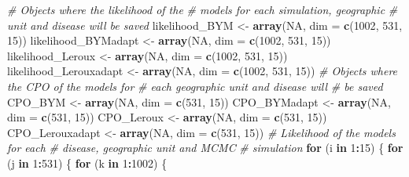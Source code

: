 \documentclass[]{article}
\newenvironment{Shaded}{\begin{snugshade}}{\end{snugshade}}
\newcommand{\KeywordTok}[1]{\textcolor[rgb]{0.13,0.29,0.53}{\textbf{#1}}}
\newcommand{\DataTypeTok}[1]{\textcolor[rgb]{0.13,0.29,0.53}{#1}}
\newcommand{\DecValTok}[1]{\textcolor[rgb]{0.00,0.00,0.81}{#1}}
\newcommand{\StringTok}[1]{\textcolor[rgb]{0.31,0.60,0.02}{#1}}
\newcommand{\CommentTok}[1]{\textcolor[rgb]{0.56,0.35,0.01}{\textit{#1}}}
\newcommand{\OtherTok}[1]{\textcolor[rgb]{0.56,0.35,0.01}{#1}}
\newcommand{\ControlFlowTok}[1]{\textcolor[rgb]{0.13,0.29,0.53}{\textbf{#1}}}
\newcommand{\OperatorTok}[1]{\textcolor[rgb]{0.81,0.36,0.00}{\textbf{#1}}}
\newcommand{\NormalTok}[1]{#1}
\begin{document}
\begin{Shaded}
\begin{Highlighting}[]
\CommentTok{# Objects where the likelihood of the}
\CommentTok{# models for each simulation, geographic}
\CommentTok{# unit and disease will be saved}
\NormalTok{likelihood_BYM <-}\StringTok{ }\KeywordTok{array}\NormalTok{(}\OtherTok{NA}\NormalTok{, }\DataTypeTok{dim =} \KeywordTok{c}\NormalTok{(}\DecValTok{1002}\NormalTok{, }
    \DecValTok{531}\NormalTok{, }\DecValTok{15}\NormalTok{))}
\NormalTok{likelihood_BYMadapt <-}\StringTok{ }\KeywordTok{array}\NormalTok{(}\OtherTok{NA}\NormalTok{, }\DataTypeTok{dim =} \KeywordTok{c}\NormalTok{(}\DecValTok{1002}\NormalTok{, }
    \DecValTok{531}\NormalTok{, }\DecValTok{15}\NormalTok{))}
\NormalTok{likelihood_Leroux <-}\StringTok{ }\KeywordTok{array}\NormalTok{(}\OtherTok{NA}\NormalTok{, }\DataTypeTok{dim =} \KeywordTok{c}\NormalTok{(}\DecValTok{1002}\NormalTok{, }
    \DecValTok{531}\NormalTok{, }\DecValTok{15}\NormalTok{))}
\NormalTok{likelihood_Lerouxadapt <-}\StringTok{ }\KeywordTok{array}\NormalTok{(}\OtherTok{NA}\NormalTok{, }\DataTypeTok{dim =} \KeywordTok{c}\NormalTok{(}\DecValTok{1002}\NormalTok{, }
    \DecValTok{531}\NormalTok{, }\DecValTok{15}\NormalTok{))}
\CommentTok{# Objects where the CPO of the models for}
\CommentTok{# each geographic unit and disease will}
\CommentTok{# be saved}
\NormalTok{CPO_BYM <-}\StringTok{ }\KeywordTok{array}\NormalTok{(}\OtherTok{NA}\NormalTok{, }\DataTypeTok{dim =} \KeywordTok{c}\NormalTok{(}\DecValTok{531}\NormalTok{, }\DecValTok{15}\NormalTok{))}
\NormalTok{CPO_BYMadapt <-}\StringTok{ }\KeywordTok{array}\NormalTok{(}\OtherTok{NA}\NormalTok{, }\DataTypeTok{dim =} \KeywordTok{c}\NormalTok{(}\DecValTok{531}\NormalTok{, }\DecValTok{15}\NormalTok{))}
\NormalTok{CPO_Leroux <-}\StringTok{ }\KeywordTok{array}\NormalTok{(}\OtherTok{NA}\NormalTok{, }\DataTypeTok{dim =} \KeywordTok{c}\NormalTok{(}\DecValTok{531}\NormalTok{, }\DecValTok{15}\NormalTok{))}
\NormalTok{CPO_Lerouxadapt <-}\StringTok{ }\KeywordTok{array}\NormalTok{(}\OtherTok{NA}\NormalTok{, }\DataTypeTok{dim =} \KeywordTok{c}\NormalTok{(}\DecValTok{531}\NormalTok{, }
    \DecValTok{15}\NormalTok{))}
\CommentTok{# Likelihood of the models for each}
\CommentTok{# disease, geographic unit and MCMC}
\CommentTok{# simulation}
\ControlFlowTok{for}\NormalTok{ (i }\ControlFlowTok{in} \DecValTok{1}\OperatorTok{:}\DecValTok{15}\NormalTok{) \{}
    \ControlFlowTok{for}\NormalTok{ (j }\ControlFlowTok{in} \DecValTok{1}\OperatorTok{:}\DecValTok{531}\NormalTok{) \{}
        \ControlFlowTok{for}\NormalTok{ (k }\ControlFlowTok{in} \DecValTok{1}\OperatorTok{:}\DecValTok{1002}\NormalTok{) \{}

\end{Highlighting}
\end{Shaded}
\end{document}
